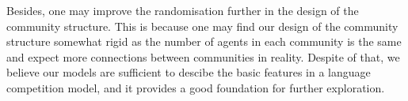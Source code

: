 \documentclass[a4paper, 11pt]{article}
\begin{document}
Besides, one may improve the randomisation further in the design of the community structure. This is because one may find our design of the community structure somewhat rigid as the number of agents in each community is the same and expect more connections between communities in reality. Despite of that, we believe our models are sufficient to descibe the basic features in a language competition model, and it provides a good foundation for further exploration.

{}

\end{document}
